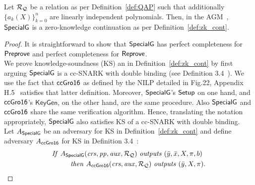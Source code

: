 \begin{theorem}
\label{sec_specialg}
Let $\mathcal{R}_{\mathcal{Q}}$ be a relation as per Definition~\ref{def:QAP} such that additionally $\{a_k(X)\}_{k=0}^n$ are linearly independent polynomials. Then, in the 
AGM~\cite{Fuchs_AGM}, ${\mathsf{SpecialG}}$ is a zero-knowledge continuation as per Definition~\ref{def:zk_cont}. 
\end{theorem}
\begin{proof} It is straightforward to show that ${\mathsf{SpecialG}}$ has perfect completeness for ${\mathsf{Preprove}}$ and perfect completeness 
for ${\mathsf{Reprove}}$. \\

\noindent We prove knowledge-soundness (KS) an in Definition~\ref{def:zk_cont} by first arguing ${\mathsf{SpecialG}}$ is a cc-SNARK with double binding 
(see Definition 3.4~\cite{LegoSNARK}).  We use the fact that ${\mathsf{ccGro16}}$ as defined by the NILP detailed in Fig.22, Appendix H.5~\cite{LegoSNARK} 
satisfies that latter definition. Moreover, ${\mathsf{SpecialG}}$'s ${\mathsf{Setup}}$ on one hand, and ${\mathsf{ccGro16}}$'s $ \mathsf{KeyGen} $, on the other hand, are the same 
procedure. Also ${\mathsf{SpecialG}}$ and ${\mathsf{ccGro16}}$ share the same verification algorithm. Hence, translating the notation appropriately, ${\mathsf{SpecialG}}$ also 
satisfies KS of a cc-SNARK with double binding. \\

\noindent Let $A_{{\mathsf{SpecialG}}}$ be an adversary for KS in Definition~\ref{def:zk_cont} and 
define adversary $A_{{\mathsf{ccGro16}}}$ for KS in Definition 3.4~\cite{LegoSNARK}:
\begin{align*}
&\mathit{If} \ A_{\SpecialG} (\crs, \pp, \realaux, \relRQ)\ \mathit{outputs} \  (\bary, \barx, X, \pi, b) \\
&\ \ \ \ \ \ \ \ \mathit{then}\ A_{\ccgroth} (\crs, \realaux, \relRQ)\ \mathit{outputs} \ (\bary, X, \pi). 
\end{align*}


\end{proof}
